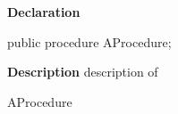 \documentclass{report}
\newif\ifpdf
\begin{document}
\label{ok_abstract_sealed.TSealedClass-AProcedure}
\begin{list}{}{
\setlength{\itemindent}{0cm}
\setlength{\listparindent}{0cm}
\setlength{\leftmargin}{\evensidemargin}
\addtolength{\leftmargin}{\tmplength}
\settowidth{\labelsep}{X}
\addtolength{\leftmargin}{\labelsep}
\setlength{\labelwidth}{\tmplength}
}
\item[\textbf{Declaration}\hfill]
\ifpdf
\begin{flushleft}
\fi
\begin{ttfamily}
public procedure AProcedure;\end{ttfamily}

\ifpdf
\end{flushleft}
\fi

\par
\item[\textbf{Description}]
description of \begin{ttfamily}AProcedure\end{ttfamily}

\end{list}
\end{document}
